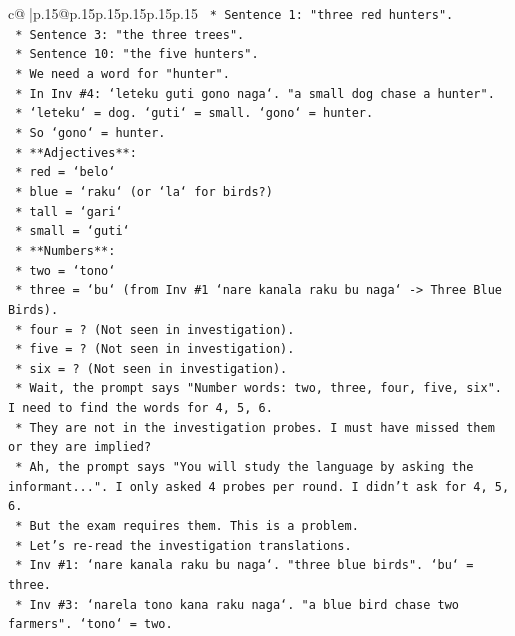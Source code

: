 \documentclass{article}
\begin{document}
{\begin{supertabular}{c@{$\;$}|p{.15\linewidth}@{}p{.15\linewidth}p{.15\linewidth}p{.15\linewidth}p{.15\linewidth}p{.15\linewidth}}
{{{\texttt{        *   Sentence 1: "three red hunters".} \\
\texttt{        *   Sentence 3: "the three trees".} \\
\texttt{        *   Sentence 10: "the five hunters".} \\
\texttt{        *   We need a word for "hunter".} \\
\texttt{        *   In Inv \#4: `leteku guti gono naga`. "a small dog chase a hunter".} \\
\texttt{        *   `leteku` = dog. `guti` = small. `gono` = hunter.} \\
\texttt{        *   So `gono` = hunter.} \\
\texttt{    *   **Adjectives**:} \\
\texttt{        *   red = `belo`} \\
\texttt{        *   blue = `raku` (or `la` for birds?)} \\
\texttt{        *   tall = `gari`} \\
\texttt{        *   small = `guti`} \\
\texttt{    *   **Numbers**:} \\
\texttt{        *   two = `tono`} \\
\texttt{        *   three = `bu` (from Inv \#1 `nare kanala raku bu naga` {-}> Three Blue Birds).} \\
\texttt{        *   four = ? (Not seen in investigation).} \\
\texttt{        *   five = ? (Not seen in investigation).} \\
\texttt{        *   six = ? (Not seen in investigation).} \\
\texttt{        *   Wait, the prompt says "Number words: two, three, four, five, six". I need to find the words for 4, 5, 6.} \\
\texttt{        *   They are not in the investigation probes. I must have missed them or they are implied?} \\
\texttt{        *   Ah, the prompt says "You will study the language by asking the informant...". I only asked 4 probes per round. I didn't ask for 4, 5, 6.} \\
\texttt{        *   But the exam requires them. This is a problem.} \\
\texttt{        *   Let's re{-}read the investigation translations.} \\
\texttt{        *   Inv \#1: `nare kanala raku bu naga`. "three blue birds". `bu` = three.} \\
\texttt{        *   Inv \#3: `narela tono kana raku naga`. "a blue bird chase two farmers". `tono` = two.} \\
}}}
\end{supertabular}}
\end{document}
